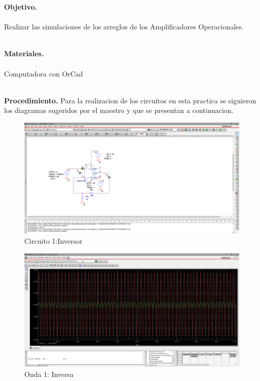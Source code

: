 \documentclass[letterpaper]{article}
\begin{document}
\newpage
\begin{large}
    \textbf{Objetivo.}\\\\
    Realizar las simulaciones de los arreglos de los Amplificadores Operacionales.\\\\
\end{large}
\begin{large}
    \textbf{Materiales.}\\\\
    Computadora con OrCad\\\\
\end{large}
\begin{large}
    \textbf{Procedimiento.}
    Para la realizacion de los circuitos en esta practica se siguieron los diagramas sugeridos por el maestro y que se presentan a continuacion.

\end{large}


\begin{figure}[htbp]
    \centering
    \includegraphics[width=18cm]{IMG/cir(4).png}
    \caption{Circuito 1:Inversor}
    \label{fig:my_label}
\end{figure}
\begin{figure}[htbp]
    \centering
    \includegraphics[width=18cm]{IMG/ond(7).png}
    \caption{Onda 1: Inversa}
    \label{fig:my_label}
\end{figure}
\end{document}
